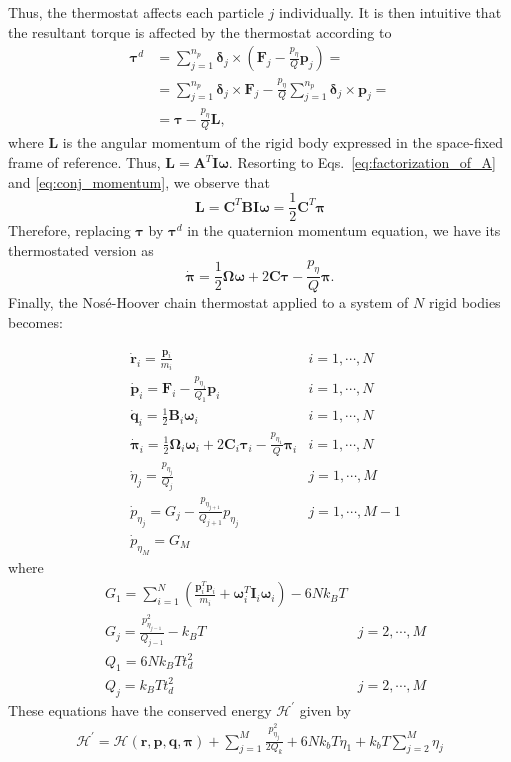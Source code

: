 \documentclass[aip,jcp,reprint,amsmath,amssymb]{revtex4-1}
\newcommand{\mt}[1]{\boldsymbol{\mathbf{#1}}}           %
\newcommand{\vt}[1]{\boldsymbol{\mathbf{#1}}}           %
\newcommand{\tr}[1]{#1^T}                               %
\begin{document}
Thus, the thermostat affects each particle $j$ individually. It is then intuitive that the resultant torque is affected by the thermostat according to
\begin{align*}
\vt \tau^d &= \sum_{j=1}^{n_p} {\vt \delta_j} \times \left( {\vt F_j}  - \frac{p_{\eta}}{Q} {\vt p}_j \right) = \\
&= \sum_{j=1}^{n_p} {\vt \delta_j} \times {\vt F_j} - \frac{p_{\eta}}{Q} \sum_{j=1}^{n_p} {\vt \delta_j} \times {\vt p}_j = \\
&= \vt \tau - \frac{p_{\eta}}{Q} \vt L,
\end{align*}
where $\vt L$ is the angular momentum of the rigid body expressed in the space-fixed frame of reference. Thus, $\vt L = \tr{\mt A}{\mt I}{\vt \omega}$. Resorting to Eqs.~\ref{eq:factorization_of_A} and \ref{eq:conj_momentum}, we observe that
\[
\vt L = \tr{\mt C}{\mt B}{\mt I}{\vt \omega} = \frac{1}{2} \tr{\mt C}{\vt \pi}
\]
Therefore, replacing $\vt \tau$ by $\vt \tau^d$ in the quaternion momentum equation, we have its thermostated version as
\[
\dot{\vt \pi} = \frac{1}{2} \mt \Omega \vt \omega + 2 \mt C \vt \tau - \frac{p_{\eta}}{Q} \vt \pi.
\]
Finally, the Nos\'{e}-Hoover chain thermostat applied to a system of $N$ rigid bodies becomes:

\begin{align*}
&\dot{\vt r}_i = \frac{{\vt p}_i}{m_i} & i = 1,\cdots,N \\
&\dot{\vt p}_i = {\vt F}_i - \frac{p_{\eta_1}}{Q_1} \vt p_i & i = 1,\cdots,N \\
&\dot{\vt q}_i = \frac{1}{2} \mt B_i \vt \omega_i & i = 1,\cdots,N \\
&\dot{\vt \pi}_i = \frac{1}{2} \mt \Omega_i \vt \omega_i + 2 \mt C_i \vt \tau_i - \frac{p_{\eta_1}}{Q} \vt \pi_i & i = 1,\cdots,N \\
&\dot{\eta}_j = \frac{p_{\eta_j}}{Q_j} & j = 1,\cdots,M \\
&{\dot p}_{\eta_j} = G_j - \frac{p_{\eta_{j+1}}}{Q_{j+1}} p_{\eta_j} & j = 1,\cdots,M-1 \\
&{\dot p}_{\eta_M} = G_M
\end{align*}
where
\begin{align*}
&G_1 = \sum_{i=1}^N \left( \frac{\tr{\vt p}_i{\vt p}_i}{m_i} + \tr{\vt \omega}_i \mt I_i \vt \omega_i \right) - 6 N k_B T \\
&G_j = \frac{p_{\eta_{j-1}}^2}{Q_{j-1}} - k_B T &j = 2,\cdots,M \\
&Q_1 = 6 N k_B T t_d^2 \\
&Q_j = k_B T t_d^2 &j = 2,\cdots,M
\end{align*}
These equations have the conserved energy $\mathcal{H}^\prime$ given by
\begin{align*}
\mathcal{H}^\prime = \mathcal{H}(\vt r, \vt p, \vt q, \vt \pi) + \sum_{j=1}^{M}\frac{p_{\eta_j}^2}{2Q_k} + 6Nk_bT\eta_1 + k_bT\sum_{j=2}^M \eta_j
\end{align*}
\end{document}

